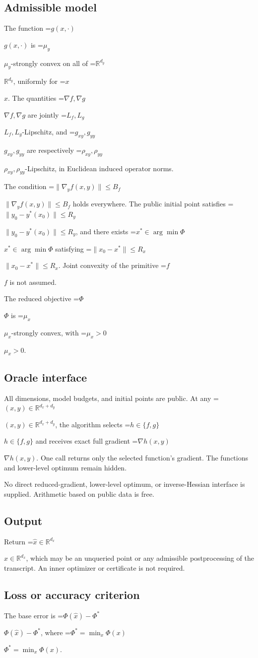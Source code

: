 \documentclass[10pt,a4paper]{article}
\newcommand{\AtlasMath}[1]{\par\begingroup\centering\setbox0=\hbox{$\displaystyle #1$}\ifdim\wd0>1.4\linewidth\typeout{ATLAS WIDE FORMULA: \the\wd0}\fi\ifdim\wd0>\linewidth\resizebox{\linewidth}{!}{\box0}\else\box0\fi\par\endgroup}
\newcommand{\AtlasInlineMath}[1]{\begingroup\setbox0=\hbox{$#1$}\ifdim\wd0>.4\linewidth\endgroup\AtlasMath{#1}\else\endgroup$#1$\fi}
\begin{document}
\subsection{Admissible model}
The function \AtlasInlineMath{g(x,\cdot)} is \AtlasInlineMath{\mu_y}-strongly convex on all of \AtlasInlineMath{\mathbb{R}^{d_y}}, uniformly for \AtlasInlineMath{x}. The quantities \AtlasInlineMath{\nabla f,\nabla g} are jointly \AtlasInlineMath{L_f,L_g}-Lipschitz, and \AtlasInlineMath{g_{xy},g_{yy}} are respectively \AtlasInlineMath{\rho_{xy},\rho_{yy}}-Lipschitz, in Euclidean induced operator norms.

The condition \AtlasInlineMath{\|\nabla_y f(x,y)\|\le B_f} holds everywhere. The public initial point satisfies \AtlasInlineMath{\|y_0-y^*(x_0)\|\le R_y}, and there exists \AtlasInlineMath{x^*\in\arg\min\Phi} satisfying \AtlasInlineMath{\|x_0-x^*\|\le R_x}. Joint convexity of the primitive \AtlasInlineMath{f} is not assumed.

The reduced objective \AtlasInlineMath{\Phi} is \AtlasInlineMath{\mu_x}-strongly convex, with \AtlasInlineMath{\mu_x>0}.

\subsection{Oracle interface}
All dimensions, model budgets, and initial points are public. At any \AtlasInlineMath{(x,y)\in\mathbb{R}^{d_x+d_y}}, the algorithm selects \AtlasInlineMath{h\in\{f,g\}} and receives exact full gradient \AtlasInlineMath{\nabla h(x,y)}. One call returns only the selected function's gradient. The functions and lower-level optimum remain hidden.

No direct reduced-gradient, lower-level optimum, or inverse-Hessian interface is supplied. Arithmetic based on public data is free.

\subsection{Output}
Return \AtlasInlineMath{\widehat{x}\in\mathbb{R}^{d_x}}, which may be an unqueried point or any admissible postprocessing of the transcript. An inner optimizer or certificate is not required.

\subsection{Loss or accuracy criterion}
The base error is \AtlasInlineMath{\Phi(\widehat{x})-\Phi^*}, where \AtlasInlineMath{\Phi^*=\min_x\Phi(x)}.
\end{document}
